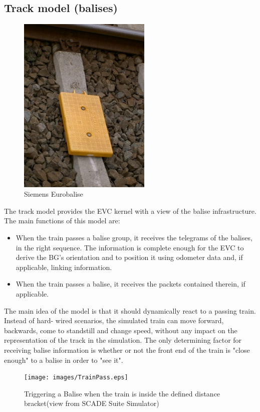 \documentclass{template/openetcs_article}
\begin{document}
\subsection{Track model (balises)}

\begin{figure}[H]
  \centering
  \includegraphics[width=2.5in]{images/Eurobalise.jpg}
  \caption{Siemens Eurobalise}
  \label{fig:eurobalise}
\end{figure}

The track model provides the EVC kernel with a view of the balise infrastructure. The main functions of this model are:
\begin{itemize}
 \item When the train passes a balise group, it receives the telegrams of the balises, in the right sequence. The information is complete enough for the EVC to derive the BG's orientation and to position it using odometer data and, if applicable, linking information.
 \item When the train passes a balise, it receives the packets contained therein, if applicable. 
\end{itemize}

The main idea of the model is that it should dynamically react to a passing train. Instead of hard- wired scenarios, the simulated train can move forward, backwards, come to standstill and change speed, without any impact on the representation of the track in the simulation. The only determining factor for receiving balise information is whether or not the front end of the train is "close enough" to a balise in order to "see it".

\begin{figure}
  \centering
  \texttt{[image: images/TrainPass.eps]}
  \caption{Triggering a Balise when the train is inside the defined distance bracket\newline (view from SCADE Suite Simulator)}
  \label{fig:balisepos}
\end{figure}
\end{document}
